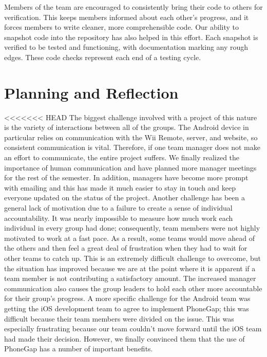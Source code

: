 \documentclass[12pt]{article}
\begin{document}
Members of the team are encouraged to consistently bring their code to others for verification.  This keeps members informed about each other's progress, and it forces members to write cleaner, more comprehensible code.  Our ability to snapshot code into the repository has also helped in this effort.  Each snapshot is verified to be tested and functioning, with documentation marking any rough edges.  These code checks represent each end of a testing cycle.


\section{Planning and Reflection}
<<<<<<< HEAD
The biggest challenge involved with a project of this nature is the variety of interactions between all of the groups.  The Android device in particular relies on communication with the Wii Remote, server, and website, so consistent communication is vital.  Therefore, if one team manager does not make an effort to communicate, the entire project suffers.  We finally realized the importance of human communication and have planned more manager meetings for the rest of the semester.  In addition, managers have become more prompt with emailing and this has made it much easier to stay in touch and keep everyone updated on the status of the project.  Another challenge has been a general lack of motivation due to a failure to create a sense of individual accountability.  It was nearly impossible to measure how much work each individual in every group had done; consequently, team members were not highly motivated to work at a fast pace.  As a result, some teams would move ahead of the others and then feel a great deal of frustration when they had to wait for other teams to catch up.  This is an extremely difficult challenge to overcome, but the situation has improved because we are at the point where it is apparent if a team member is not contributing a satisfactory amount.  The increased manager communication also causes the group leaders to hold each other more accountable for their group’s progress.  A more specific challenge for the Android team was getting the iOS development team to agree to implement PhoneGap; this was difficult because their team members were divided on the issue.  This was especially frustrating because our team couldn’t move forward until the iOS team had made their decision.  However, we finally convinced them that the use of PhoneGap has a number of important benefits.
\end{document}
